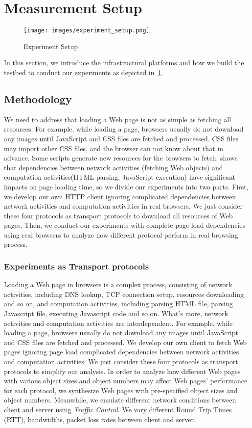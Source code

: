 \section{Measurement Setup}

\begin{figure}[htbp]
	\centering
    \texttt{[image: images/experiment\_setup.png]}
    \caption{Experiment Setup} \label{fig:experiment_setup}
\end{figure}

In this section, we introduce the infrastructural platforms and how we build the testbed to conduct our experiments as depicted in~\ref{fig:experiment_setup}.

\subsection{Methodology}
We need to address that loading a Web page is not as simple as fetching all resources. For example, while loading a page, browsers usually do not download any images until JavaScript and CSS files are fetched and processed. CSS files may import other CSS files, and the browser can not know about that in advance. Some scripts generate new resources for the browsers to fetch. \cite{Wang:NSDI13} shows that dependencies between network activities (fetching Web objects) and computation activities(HTML parsing, JavaScript execution) have significant impacts on page loading time, so we divide our experiments into two parts. First, we develop our own HTTP client ignoring complicated dependencies between network activities and computation activities in real browsers. We just consider these four protocols as transport protocols to download all resources of Web pages. Then, we conduct our experiments with complete page load dependencies using real browsers to analyze how different protocol perform in real browsing process.

\subsubsection{Experiments as Transport protocols}
 Loading a Web page in browsers is a complex process, consisting of network activities, including DNS lookup, TCP connection setup, resources downloading and so on, and computation activities, including parsing HTML file, parsing Javascript file, executing Javascript code and so on. What's more, network activities and computation activities are interdependent. For example, while loading a page, browsers usually do not download any images until JavaScript and CSS files are fetched and processed. We develop our own client to fetch Web pages ignoring page load complicated dependencies between network activities and computation activities. We just consider these four protocols as transport protocols to simplify our analysis. In order to analyze how different Web pages with various object sizes and object numbers may affect Web pages' performance for each protocol, we synthesize Web pages with pre-specified object sizes and object numbers. Meanwhile, we emulate different network conditions between client and server using \textit{Traffic Control}. We vary different Round Trip Times (RTT), bandwidths, packet loss rates between client and server.
 
